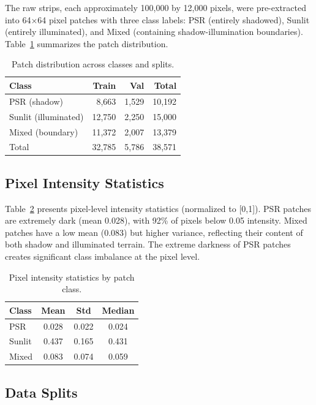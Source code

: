 \documentclass[journal]{IEEEtran}
\begin{document}
The raw strips, each approximately 100,000 by 12,000 pixels, were pre-extracted into 64$\times$64 pixel patches with three class labels: PSR (entirely shadowed), Sunlit (entirely illuminated), and Mixed (containing shadow-illumination boundaries). Table~\ref{tab:patches} summarizes the patch distribution.

\begin{table}[h]
\centering
\caption{Patch distribution across classes and splits.}
\label{tab:patches}
\begin{tabular}{lrrr}
\toprule
\textbf{Class} & \textbf{Train} & \textbf{Val} & \textbf{Total} \\
\midrule
PSR (shadow) & 8,663 & 1,529 & 10,192 \\
Sunlit (illuminated) & 12,750 & 2,250 & 15,000 \\
Mixed (boundary) & 11,372 & 2,007 & 13,379 \\
\midrule
Total & 32,785 & 5,786 & 38,571 \\
\bottomrule
\end{tabular}
\end{table}

\subsection{Pixel Intensity Statistics}

Table~\ref{tab:intensity} presents pixel-level intensity statistics (normalized to [0,1]). PSR patches are extremely dark (mean 0.028), with 92\% of pixels below 0.05 intensity. Mixed patches have a low mean (0.083) but higher variance, reflecting their content of both shadow and illuminated terrain. The extreme darkness of PSR patches creates significant class imbalance at the pixel level.

\begin{table}[h]
\centering
\caption{Pixel intensity statistics by patch class.}
\label{tab:intensity}
\begin{tabular}{lccc}
\toprule
\textbf{Class} & \textbf{Mean} & \textbf{Std} & \textbf{Median} \\
\midrule
PSR & 0.028 & 0.022 & 0.024 \\
Sunlit & 0.437 & 0.165 & 0.431 \\
Mixed & 0.083 & 0.074 & 0.059 \\
\bottomrule
\end{tabular}
\end{table}

\subsection{Data Splits}
\end{document}

